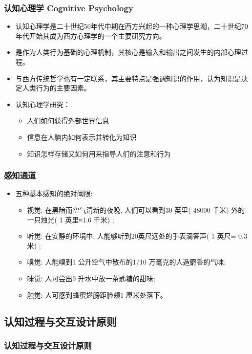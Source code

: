 \documentclass{beamer}
\begin{document}
\begin{frame}
	\frametitle{认知心理学 Cognitive Psychology}
	\beamertemplatetransparentcovereddynamicmedium 
	\begin{itemize}
		\item 认知心理学是二十世纪50年代中期在西方兴起的一种心理学思潮，二十世纪70年代开始其成为西方心理学的一个主要研究方向。
		\pause
		\item 是作为人类行为基础的心理机制，其核心是输入和输出之间发生的内部心理过程。
		\pause
		\item 与西方传统哲学也有一定联系，其主要特点是强调知识的作用，认为知识是决定人类行为的主要因素。
		\pause
		\item 认知心理学研究：
		\begin{itemize}
			\item 人们如何获得外部世界信息
			\item 信息在人脑内如何表示并转化为知识
			\item 知识怎样存储又如何用来指导人们的注意和行为
		\end{itemize}
	\end{itemize}
\end{frame}

\begin{frame}
	\frametitle{感知通道}
	\beamertemplatetransparentcovereddynamicmedium 
	\begin{itemize}[<+->]
		\item 五种基本感知的绝对阈限:
		\begin{itemize}
			\item 视觉: 在黑暗而空气清新的夜晚, 人们可以看到30 英里( 48000 千米) 外的一只烛光( 1 英里≈1.6 千米) ; 
			\item 听觉: 在安静的环境中, 人能够听到20英尺远处的手表滴答声( 1 英尺= 0.3 米) ; 
			\item 嗅觉: 人能嗅到1 公升空气中散布的1/10 万毫克的人造麝香的气味; 
			\item 味觉: 人可尝出9 升水中放一茶匙糖的甜味; 
			\item 触觉: 人可感到蜂蜜翅膀距脸颊1 厘米处落下。
		\end{itemize}
	\end{itemize}
\end{frame}

\subsection{认知过程与交互设计原则}
\begin{frame}
	\frametitle{认知过程与交互设计原则}

\end{frame}
\end{document}
